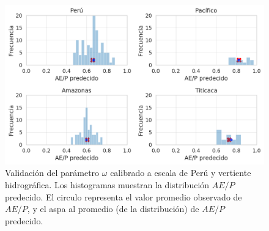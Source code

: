 \begin{figure}[htb]
	\includegraphics[scale=.78]{Images/09_proBK_val.png}
	\centering
	\caption{Validación del parámetro $\omega$ calibrado a escala de Perú y vertiente hidrográfica. Los histogramas muestran la distribución $AE/P$ predecido. El circulo representa el valor promedio observado de $AE/P$, y el aspa al promedio (de la distribución) de $AE/P$ predecido.}
	\label{fig:09_proBK_val}
\end{figure}
